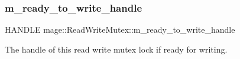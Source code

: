 \subsubsection{\texorpdfstring{m\+\_\+ready\+\_\+to\+\_\+write\+\_\+handle}{m\_ready\_to\_write\_handle}}
{\footnotesize\ttfamily H\+A\+N\+D\+LE mage\+::\+Read\+Write\+Mutex\+::m\+\_\+ready\+\_\+to\+\_\+write\+\_\+handle\hspace{0.3cm}{\ttfamily [private]}}

The handle of this read write mutex lock if ready for writing. 